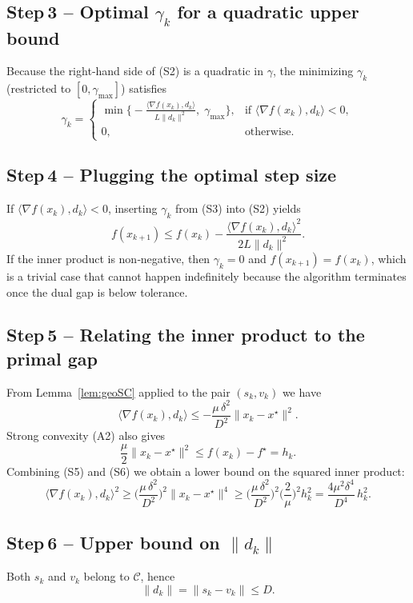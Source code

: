 \documentclass{article}
\begin{document}
\subsection*{Step 3 – Optimal $\gamma_k$ for a quadratic upper bound}
Because the right‑hand side of (S2) is a quadratic in $\gamma$, the minimizing
$\gamma_k$ (restricted to $[0,\gamma_{\max}]$) satisfies
\[
\gamma_k=
\begin{cases}
\displaystyle\min\!\Big\{-\frac{\langle\nabla f(x_k),d_k\rangle}{L\|d_k\|^{2}},\;\gamma_{\max}\Big\},
&\text{if }\langle\nabla f(x_k),d_k\rangle<0,
\\[2mm]
0,&\text{otherwise.}
\end{cases}
\tag{S3}
\]

\subsection*{Step 4 – Plugging the optimal step size}
If $\langle\nabla f(x_k),d_k\rangle<0$, inserting $\gamma_k$ from (S3) into (S2) yields
\[
f(x_{k+1})\le f(x_k)-\frac{\langle\nabla f(x_k),d_k\rangle^{2}}
{2L\|d_k\|^{2}} .
\tag{S4}
\]
If the inner product is non‑negative, then $\gamma_k=0$ and $f(x_{k+1})=f(x_k)$,
which is a trivial case that cannot happen indefinitely because the algorithm
terminates once the dual gap is below tolerance.

\subsection*{Step 5 – Relating the inner product to the primal gap}
From Lemma~\ref{lem:geoSC} applied to the pair $(s_k,v_k)$ we have
\[
\langle\nabla f(x_k),d_k\rangle\le
-\frac{\mu\,\delta^{2}}{D^{2}}\|x_k-x^\star\|^{2}.
\tag{S5}
\]
Strong convexity (A2) also gives
\[
\frac{\mu}{2}\|x_k-x^\star\|^{2}\le f(x_k)-f^\star = h_k .
\tag{S6}
\]
Combining (S5) and (S6) we obtain a lower bound on the squared inner product:
\[
\langle\nabla f(x_k),d_k\rangle^{2}
\ge
\Big(\frac{\mu\,\delta^{2}}{D^{2}}\Big)^{2}\|x_k-x^\star\|^{4}
\ge
\Big(\frac{\mu\,\delta^{2}}{D^{2}}\Big)^{2}\Big(\frac{2}{\mu}\Big)^{2}h_k^{2}
= \frac{4\mu^{2}\delta^{4}}{D^{4}}\,h_k^{2}.
\tag{S7}
\]

\subsection*{Step 6 – Upper bound on $\|d_k\|$}
Both $s_k$ and $v_k$ belong to $\mathcal C$, hence
\[
\|d_k\|=\|s_k-v_k\|\le D .
\tag{S8}
\]
\end{document}
